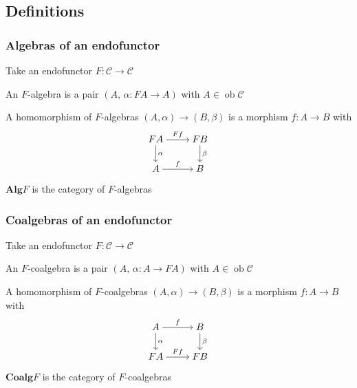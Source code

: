 \documentclass{beamer}
\DeclareMathOperator{\ob}{ob}
\begin{document}
\subsection{Definitions}
\begin{frame}[fragile]
  \frametitle{Algebras of an endofunctor}
  Take an endofunctor $F :\mathscr{C} \to \mathscr{C}$
  \begin{definition}[$F$-algebra]
    An $F$-algebra is a pair $(A,\,\alpha: FA \to A)$ with $A \in \ob \mathscr{C}$
  \end{definition}
  \pause
  \begin{definition}
    A homomorphism of $F$-algebras $(A,\alpha) \to (B,\beta)$ is a morphism $f: A \to B$ with
    \begin{equation*}
      \begin{tikzcd}[cramped]
        FA \rar{Ff} \dar{\alpha} & FB \dar{\beta} \\
        A \rar{f} & B
      \end{tikzcd}
    \end{equation*}
  \end{definition}
  $\mathbf{Alg} F$ is the category of $F$-algebras
\end{frame}
\begin{frame}[fragile]
  \frametitle{\alert{Co}algebras of an endofunctor}
  Take an endofunctor $F :\mathscr{C} \to \mathscr{C}$
  \begin{definition}
    An $F$-\alert{co}algebra is a pair $(A,\,\alpha: A \to FA)$ with $A \in \ob \mathscr{C}$
  \end{definition}
  \begin{definition}
    A homomorphism of $F$-coalgebras $(A,\alpha) \to (B,\beta)$ is a morphism $f: A \to B$ with
    \begin{equation*}
      \begin{tikzcd}[cramped]
        A \rar{f}\dar{\alpha}  & B \dar{\beta} \\
        FA \rar{Ff} & FB
      \end{tikzcd}
    \end{equation*}
  \end{definition}
  $\mathbf{Coalg} F$ is the category of $F$-coalgebras
\end{frame}
\end{document}
